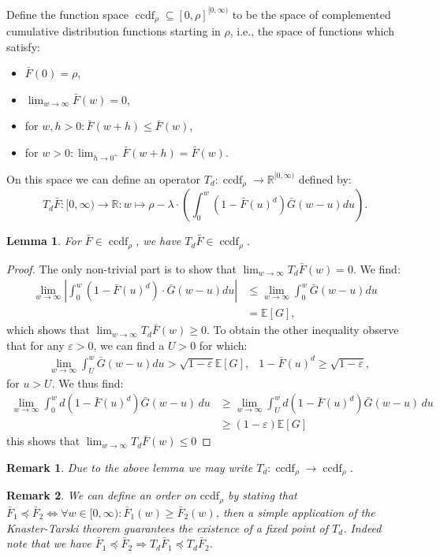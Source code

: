 \documentclass[12pt]{report}
\newcommand{\E}{\mathbb{E}}
\newcommand{\R}{\mathbb{R}}
\newtheorem{remark}{Remark}
\newtheorem{lemma}[theorem]{Lemma}
\begin{document}
Define the function space $\operatorname{ccdf}_{\rho} \subseteq [0, \rho]^{[0,\infty)}$ to be the space of complemented cumulative distribution functions starting in $\rho$, i.e., the space of functions which satisfy: 
\begin{itemize}
\item $\bar F(0) = \rho$,
\item $\lim_{w\rightarrow\infty} \bar F(w) = 0$,
\item for $w,h>0: \bar F(w+h) \leq \bar F(w)$,
\item for $w>0: \lim_{h\rightarrow 0^+} \bar F(w+h) = \bar F(w)$.
\end{itemize}
On this space we can define an operator $T_d: \operatorname{ccdf}_{\rho} \longrightarrow \R^{[0,\infty)}$ defined by:
$$
T_d\bar F: [0,\infty) \rightarrow \R: w \mapsto \rho - \lambda \cdot \left( \int_{0}^w (1-\bar F(u)^d) \bar G(w-u) du \right).
$$
\begin{lemma}\label{operator_lem}
For $\bar F \in \operatorname{ccdf}_{\rho}$, we have $T_d\bar F \in \operatorname{ccdf}_{\rho}$.
\end{lemma}\begin{proof}
The only non-trivial part is to show that $\lim_{w\rightarrow \infty} T_d\bar F(w) = 0$. We find:
\begin{align*}
\lim_{w\rightarrow \infty} \left| \int_0^w (1-\bar F(u)^d) \cdot \bar G(w-u) du \right|
&\leq \lim_{w\rightarrow \infty} \int_0^w \bar G(w-u) du\\
&= \E[G],
\end{align*}
which shows that $\lim_{w\rightarrow \infty} T_d\bar F(w) \geq 0$. To obtain the other inequality observe that for any $\varepsilon > 0$, we can find a $U > 0$ for which:
\begin{align*}
&\lim_{w\rightarrow \infty} \int_U^w \bar G(w-u) du > \sqrt{1 - \varepsilon} \E[G],
&1-\bar F(u)^d \geq \sqrt{1 - \varepsilon},
\end{align*}
for $u > U$.
We thus find:
\begin{align*}
\lim_{w\rightarrow \infty} \int_0^w d (1-\bar F(u)^d) \bar G(w-u)\, du
& \geq \lim_{w\rightarrow \infty} \int_U^w d (1-\bar F(u)^d) \bar G(w-u)\, du\\
& \geq (1 - \varepsilon)\E[G]
\end{align*}
this shows that $\lim_{w\rightarrow\infty}T_d\bar F(w) \leq 0$
\end{proof}

\begin{remark}
Due to the above lemma we may write $T_d: \operatorname{ccdf}_{\rho} \rightarrow \operatorname{ccdf}_{\rho}$.
\end{remark}
\begin{remark}
We can define an order on $\mbox{ccdf}_{\rho}$ by stating that $\bar F_1 \preceq \bar F_2 \Leftrightarrow \forall w \in [0,\infty): \bar F_1(w) \geq \bar F_2(w)$, then a simple application of the Knaster-Tarski theorem \cite{tarski1955} guarantees the existence of a fixed point of $T_d$. Indeed note that we have $\bar F_1 \preceq \bar F_2 \Rightarrow T_d \bar F_1 \preceq T_d \bar F_2$.
\end{remark}
\end{document}
